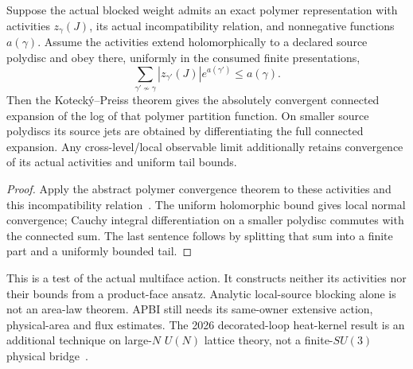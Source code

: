\documentclass[12pt,a4paper]{article}
\begin{document}
\begin{proposition}
\label{p10:prop:v2210-lit-multiface-polymer-domain}
Suppose the actual blocked weight admits an exact polymer representation
with activities $z_\gamma(J)$, its actual incompatibility relation, and
nonnegative functions $a(\gamma)$. Assume the activities extend holomorphically
to a declared source polydisc and obey there, uniformly in the consumed
finite presentations,
\[
 \sum_{\gamma'\not\sim\gamma}
 |z_{\gamma'}(J)|e^{a(\gamma')}\le a(\gamma).
\]
Then the Koteck\'{y}--Preiss theorem gives the absolutely convergent connected
expansion of the log of that polymer partition function. On smaller source
polydiscs its source jets are obtained by differentiating the full connected
expansion. Any cross-level/local observable limit additionally retains
convergence of its actual activities and uniform tail bounds.
\end{proposition}
\begin{proof}
Apply the abstract polymer convergence theorem to these activities and this
incompatibility relation~\cite{KoteckyPreiss1986}. The uniform holomorphic
bound gives local normal convergence; Cauchy integral differentiation on a
smaller polydisc commutes with the connected sum. The last sentence follows
by splitting that sum into a finite part and a uniformly bounded tail.
\end{proof}
This is a test of the actual multiface action. It constructs neither its
activities nor their bounds from a product-face ansatz. Analytic local-source
blocking alone is not an area-law theorem. APBI still needs its same-owner
extensive action, physical-area and flux estimates. The 2026 decorated-loop
heat-kernel result is an additional technique on large-$N$ $U(N)$ lattice
theory, not a finite-$SU(3)$ physical bridge~\cite{LitQCDLemoine2026HeatMaster}.


\end{document}
